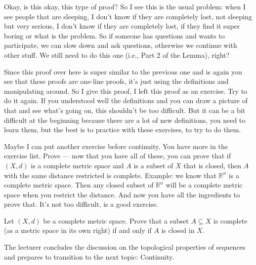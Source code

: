 \begin{spoken-clean}[00:25:30 - 00:27:23]
Okay, is this okay, this type of proof? So I see this is the usual problem: when I see people that are sleeping, I don't know if they are completely lost, not sleeping but very serious, I don't know if they are completely lost, if they find it super boring or what is the problem. So if someone has questions and wants to participate, we can slow down and ask questions, otherwise we continue with other stuff. We still need to do this one (i.e., Part 2 of the Lemma), right?
\end{spoken-clean}

\begin{spoken-clean}[00:27:23 - 00:28:37]
Since this proof over here is super similar to the previous one and is again you see that these proofs are one-line proofs, it's just using the definitions and manipulating around. So I give this proof, I left this proof as an exercise. Try to do it again. If you understood well the definitions and you can draw a picture of that and see what's going on, this shouldn't be too difficult. But it can be a bit difficult at the beginning because there are a lot of new definitions, you need to learn them, but the best is to practice with these exercises, to try to do them.
\end{spoken-clean}

\begin{spoken-clean}[00:28:37 - 00:30:00]
Maybe I can put another exercise before continuity. You have more in the exercise list. Prove --- now that you have all of these, you can prove that if $(X, d)$ is a complete metric space and $A$ is a subset of $X$ that is closed, then $A$ with the same distance restricted is complete. Example: we know that $\mathbb{R}^n$ is a complete metric space. Then any closed subset of $\mathbb{R}^n$ will be a complete metric space when you restrict the distance. And now you have all the ingredients to prove that. It's not too difficult, is a good exercise.
\end{spoken-clean}

\begin{nice-box}
\setcounter{theorem}{49}
\begin{exercise}\label{ex:closed-complete}
Let $(X, d)$ be a complete metric space. Prove that a subset $A \subseteq X$ is complete (as a metric space in its own right) if and only if $A$ is closed in $X$.
\end{exercise}
\end{nice-box}

\begin{meta-note}
The lecturer concludes the discussion on the topological properties of sequences and prepares to transition to the next topic: Continuity.
\end{meta-note}

